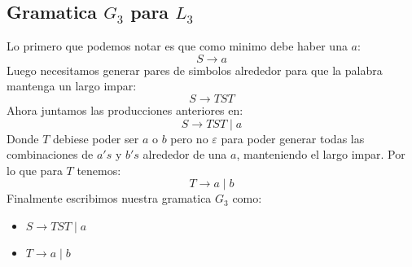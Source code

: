 \documentclass[spanish, draft]{article}
\begin{document}
    \subsection{Gramatica $G_3$ para $L_3$}
        Lo primero que podemos notar es que como minimo debe haber una $a$:
        $$S \longrightarrow a$$
        Luego necesitamos generar pares de simbolos alrededor para que la palabra
        mantenga un largo impar:
        $$S \longrightarrow TST$$
        Ahora juntamos las producciones anteriores en:
        $$S \longrightarrow TST \mid a$$
        Donde $T$ debiese poder ser $a$ o $b$ pero no $\varepsilon$ para poder
        generar todas las combinaciones de $a's$ y $b's$ alrededor de una $a$,
        manteniendo el largo impar. Por lo que para $T$ tenemos:
        $$T \longrightarrow a \mid b$$
        Finalmente escribimos nuestra gramatica $G_3$ como:
        \begin{itemize}
            \item[] $S \longrightarrow TST \mid a$
            \item[] $T \longrightarrow a \mid b$
        \end{itemize}
\end{document}
